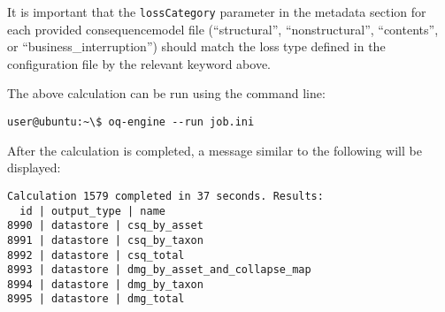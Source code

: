 It is important that the \Verb+lossCategory+ parameter in the metadata section
for each provided \gls{consequencemodel} file (``structural'', ``nonstructural'',
``contents'', or ``business\_interruption'') should match the loss type
defined in the configuration file by the relevant keyword above.

The above calculation can be run using the command line:

\begin{verbatim}
user@ubuntu:~\$ oq-engine --run job.ini
\end{verbatim}

After the calculation is completed, a message similar to the following will be
displayed:

\begin{verbatim}
Calculation 1579 completed in 37 seconds. Results:
  id | output_type | name
8990 | datastore | csq_by_asset
8991 | datastore | csq_by_taxon
8992 | datastore | csq_total
8993 | datastore | dmg_by_asset_and_collapse_map
8994 | datastore | dmg_by_taxon
8995 | datastore | dmg_total
\end{verbatim}